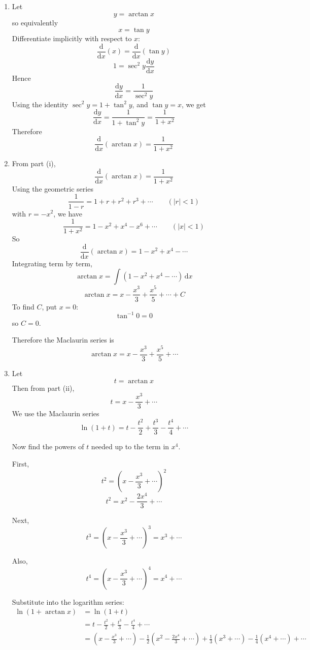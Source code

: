 \documentclass[leqno]{article}
\begin{document}
\begin{enumerate}[
  label=\textbf{\arabic*.},
  leftmargin=*,
  topsep=0pt,
  partopsep=0pt,
  parsep=0pt
]
\begin{tcolorbox}[colback=white, colframe=scarlet, title={\textbf{Solution}}, breakable, grow to left by=6mm, grow to right by=10mm]
\begin{enumerate}[label=\textbf{(\roman*)}]
  \item Let
  \[
  y=\arctan x
  \]
  so equivalently
  \[
  x=\tan y
  \]
  Differentiate implicitly with respect to $x$:
  \[
  \frac{\mathrm{d}}{\mathrm{d}x}(x)=\frac{\mathrm{d}}{\mathrm{d}x}(\tan y)
  \]
  \[
  1=\sec^2 y\frac{\mathrm{d}y}{\mathrm{d}x}
  \]
  Hence
  \[
  \frac{\mathrm{d}y}{\mathrm{d}x}=\frac{1}{\sec^2 y}
  \]
  Using the identity $\sec^2 y=1+\tan^2 y$, and $\tan y=x$, we get
  \[
  \frac{\mathrm{d}y}{\mathrm{d}x}=\frac{1}{1+\tan^2 y}=\frac{1}{1+x^2}
  \]
  Therefore
  \[
  \frac{\mathrm{d}}{\mathrm{d}x}(\arctan x)=\frac{1}{1+x^2}
  \]

  \item From part (i),
  \[
  \frac{\mathrm{d}}{\mathrm{d}x}(\arctan x)=\frac{1}{1+x^2}
  \]
  Using the geometric series
  \[
  \frac{1}{1-r}=1+r+r^2+r^3+\cdots \qquad (|r|<1)
  \]
  with $r=-x^2$, we have
  \[
  \frac{1}{1+x^2}=1-x^2+x^4-x^6+\cdots \qquad (|x|<1)
  \]
  So
  \[
  \frac{\mathrm{d}}{\mathrm{d}x}(\arctan x)=1-x^2+x^4-\cdots
  \]
  Integrating term by term,
  \[
  \arctan x=\int (1-x^2+x^4-\cdots)\,\mathrm{d}x
  \]
  \[
  \arctan x=x-\frac{x^3}{3}+\frac{x^5}{5}+\cdots +C
  \]
  To find $C$, put $x=0$:
  \[
  \tan^{-1}0=0
  \]
  so $C=0$.

  Therefore the Maclaurin series is
  \[
  \arctan x=x-\frac{x^3}{3}+\frac{x^5}{5}+\cdots
  \]

  \item Let
  \[
  t=\arctan x
  \]
  Then from part (ii),
  \[
  t=x-\frac{x^3}{3}+\cdots
  \]
  We use the Maclaurin series
  \[
  \ln(1+t)=t-\frac{t^2}{2}+\frac{t^3}{3}-\frac{t^4}{4}+\cdots
  \]

  Now find the powers of $t$ needed up to the term in $x^4$.

  First,
  \[
  t^2=\left(x-\frac{x^3}{3}+\cdots\right)^2
  \]
  \[
  t^2=x^2-\frac{2x^4}{3}+\cdots
  \]

  Next,
  \[
  t^3=\left(x-\frac{x^3}{3}+\cdots\right)^3=x^3+\cdots
  \]

  Also,
  \[
  t^4=\left(x-\frac{x^3}{3}+\cdots\right)^4=x^4+\cdots
  \]

  Substitute into the logarithm series:
  \begin{align*}
  \ln(1+\arctan x)
  &=\ln(1+t)\\
  &=t-\frac{t^2}{2}+\frac{t^3}{3}-\frac{t^4}{4}+\cdots\\
  &=\left(x-\frac{x^3}{3}+\cdots\right)
   -\frac12\left(x^2-\frac{2x^4}{3}+\cdots\right)
   +\frac13\left(x^3+\cdots\right)
   -\frac14\left(x^4+\cdots\right)
   +\cdots
  \end{align*}


\end{enumerate}
\end{tcolorbox}
\end{enumerate}
\end{document}
